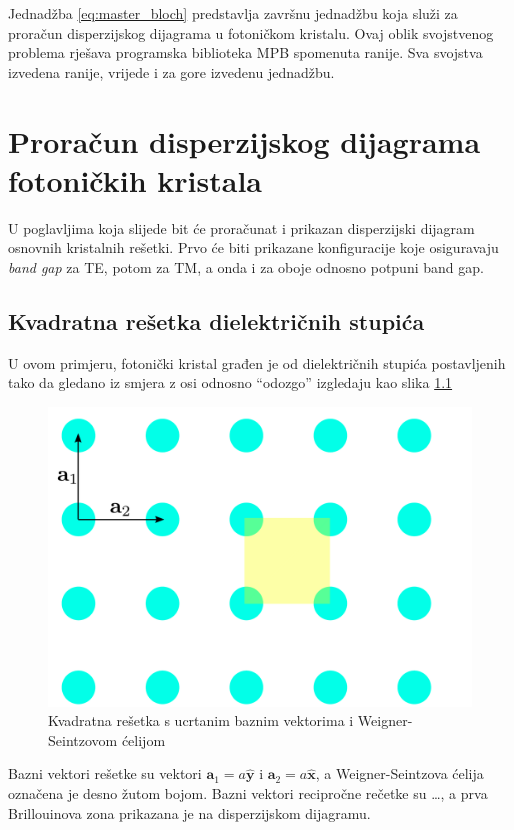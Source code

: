 \documentclass[utf8, seminar]{fer}
\begin{document}
Jednadžba \ref{eq:master_bloch} predstavlja završnu jednadžbu koja služi za
proračun disperzijskog dijagrama u fotoničkom kristalu. Ovaj oblik
svojstvenog problema rješava programska biblioteka MPB spomenuta ranije. Sva
svojstva izvedena ranije, vrijede i za gore izvedenu jednadžbu.

\chapter{Proračun disperzijskog dijagrama fotoničkih kristala}

U poglavljima koja slijede bit će proračunat i prikazan disperzijski dijagram
osnovnih kristalnih rešetki. Prvo će biti prikazane konfiguracije koje
osiguravaju \textit{band gap} za TE, potom za TM, a onda i za oboje odnosno
potpuni band gap.

\section{Kvadratna rešetka dielektričnih stupića}

U ovom primjeru, fotonički kristal građen je od dielektričnih stupića
postavljenih tako da gledano iz smjera z osi odnosno ``odozgo'' izgledaju kao
slika \ref{fig:square_lattice}

\begin{figure}[h]
	\centering
	\includegraphics[width = 1.0\linewidth]{./images/square_lattice.pdf}
	\caption{Kvadratna rešetka s ucrtanim baznim vektorima i Weigner-Seintzovom
	ćelijom}
	\label{fig:square_lattice}
\end{figure}

Bazni vektori rešetke su vektori ${\mathbf{a}_1 = a \hat{\mathbf{y}}}$ i
${\mathbf{a}_2= a \hat{\mathbf{x}}}$, a Weigner-Seintzova ćelija označena je
desno žutom bojom.
Bazni vektori recipročne rečetke su \dots, a prva Brillouinova zona prikazana
je na disperzijskom dijagramu.
\end{document}
